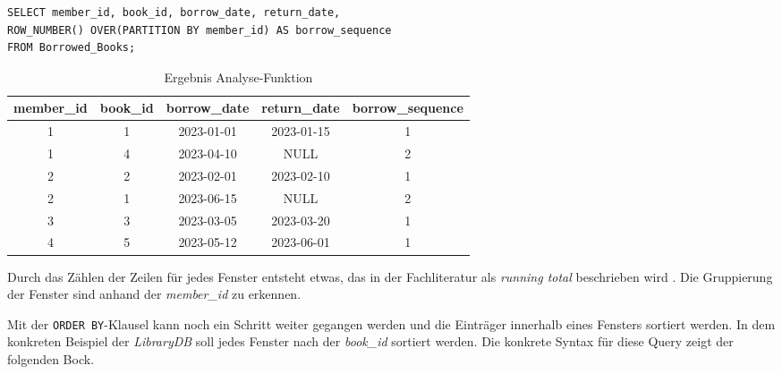 \begin{lstlisting}
SELECT member_id, book_id, borrow_date, return_date,
ROW_NUMBER() OVER(PARTITION BY member_id) AS borrow_sequence
FROM Borrowed_Books;
\end{lstlisting}
\begin{table}[h]
	\centering
	\begin{tabular}{|c|c|c|c|c|}
		\hline
		\textbf{member\_id} & \textbf{book\_id} & \textbf{borrow\_date} & \textbf{return\_date} & \textbf{borrow\_sequence} \\
		\hline
		1                   & 1                 & 2023-01-01            & 2023-01-15            & 1                         \\
		\hline
		1                   & 4                 & 2023-04-10            & NULL                  & 2                         \\
		\hline
		2                   & 2                 & 2023-02-01            & 2023-02-10            & 1                         \\
		\hline
		2                   & 1                 & 2023-06-15            & NULL                  & 2                         \\
		\hline
		3                   & 3                 & 2023-03-05            & 2023-03-20            & 1                         \\
		\hline
		4                   & 5                 & 2023-05-12            & 2023-06-01            & 1                         \\
		\hline
	\end{tabular}
	\caption{Ergebnis Analyse-Funktion}
	\label{tab:ergebnnis_analyse_funktion}
\end{table}

Durch das Zählen der Zeilen für jedes Fenster entsteht etwas, das in der
Fachliteratur als \textit{running total} beschrieben wird \citep{Nuijten2023}. Die
Gruppierung der Fenster sind anhand der \textit{member\_id} zu erkennen.

Mit der \texttt{ORDER BY}-Klausel kann noch ein Schritt weiter gegangen werden und
die Einträger innerhalb eines Fensters sortiert werden. In dem konkreten
Beispiel der \textit{LibraryDB} soll jedes Fenster nach der \textit{book\_id}
sortiert werden. Die konkrete Syntax für diese Query zeigt der folgenden Bock.

